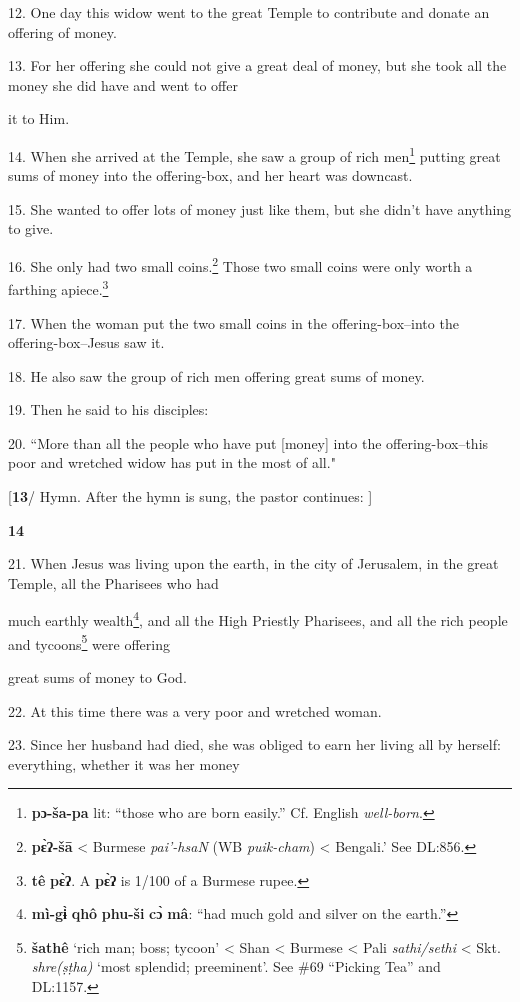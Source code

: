 12. One day this widow went to the great Temple to contribute and donate an offering
of money.

13. For her offering she could not give a great deal of money, but she took all
the money she did have and went to offer

it to Him.

14. When she arrived at the Temple, she saw a group of rich men\footnote{\textbf{pɔ-ša-pa} lit: ``those who are born easily.'' Cf. English \textit{well-born}.} putting great
sums of money into the offering-box, and her heart was downcast.

15. She wanted to offer lots of money just like them, but she didn't have anything
to give.

16. She only had two small coins.\footnote{\textbf{pɛ̀ʔ-šā} < Burmese \textit{pai'-hsaN} (WB \textit{puik-cham}) < Bengali.' See DL:856.} Those two small coins were only worth a farthing
apiece.\footnote{\textbf{tê} \textbf{pɛ̀ʔ}. A \textbf{pɛ̀ʔ} is 1/100 of a Burmese rupee.}

17. When the woman put the two small coins in the offering-box--into the offering-box--Jesus
saw it.

18. He also saw the group of rich men offering great sums of money.

19. Then he said to his disciples:

20. ``More than all the people who have put [money] into the offering-box--this
poor and wretched widow has put in the most of all."

[\textbf{13}/ Hymn. After the hymn is sung, the pastor continues: ]

\textbf{14 }

21. When Jesus was living upon the earth, in the city of Jerusalem, in the great
Temple, all the Pharisees who had

much earthly wealth\footnote{\textbf{mì-gɨ̀} \textbf{qhô} \textbf{phu-ši} \textbf{cɔ̀} \textbf{mâ}: ``had much gold and silver on the earth.''}, and all the High Priestly Pharisees, and all the rich
people and tycoons\footnote{\textbf{šathê} `rich man; boss; tycoon' < Shan < Burmese < Pali \textit{sathi/sethi} < Skt. \textit{shre(ṣṭha)} `most splendid; preeminent'. See \#69 ``Picking Tea'' and DL:1157.} were offering

great sums of money to God.

22. At this time there was a very poor and wretched woman.

23. Since her husband had died, she was obliged to earn her living all by herself:
everything, whether it was her money


